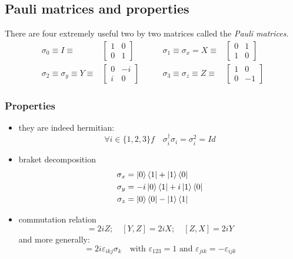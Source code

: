 \documentclass{article}
\begin{document}
\subsection{Pauli matrices and properties}
There are four extremely useful two by two matrices called the \textit{Pauli
matrices}.
$$
\begin{aligned}
    \sigma_0 \equiv I \equiv &
        \begin{bmatrix}
            1 & 0 \\ 0 & 1
        \end{bmatrix}
    \quad & \quad
    \sigma_1 \equiv \sigma_x = X \equiv &
        \begin{bmatrix}
            0 & 1 \\ 1 & 0
        \end{bmatrix}
    \\
    \sigma_2 \equiv \sigma_y \equiv Y \equiv &
        \begin{bmatrix}
            0 & -i \\ i & 0
        \end{bmatrix}
    \quad & \quad
    \sigma_3 \equiv \sigma_z \equiv Z \equiv &
        \begin{bmatrix}
            1 & 0 \\ 0 & -1
        \end{bmatrix}
\end{aligned}
$$
\subsubsection*{Properties}
\begin{itemize}[label=-]
    \item they are indeed hermitian:
    \begin{equation}
        \forall i \in \{1, 2, 3\} f\quad \sigma_i^\dagger\sigma_i = \sigma_i^2 = Id
    \end{equation}
    \item braket decomposition
    \begin{equation}
        \begin{aligned}
            \sigma_x & = \ket{0}\bra{1} + \ket{1}\bra{0}
            \\
            \sigma_y & = -i\ket{0}\bra{1} + i\ket{1}\bra{0}
            \\
            \sigma_z & = \ket{0}\bra{0} - \ket{1}\bra{1}
        \end{aligned}
    \end{equation}
    \item commutation relation %
        \begin{equation}
            [X,Y] = 2iZ; \quad [Y, Z] = 2iX; \quad [Z,X] = 2iY
        \end{equation}
    and more generally:
        \begin{equation}
            [\sigma_i, \sigma_j] = 2i\varepsilon_{ikj}\sigma_k\quad\text{with }\varepsilon_{123} = 1 \text{ and } \varepsilon_{jik}=-\varepsilon_{ijk}
        \end{equation}

\end{itemize}
\end{document}
